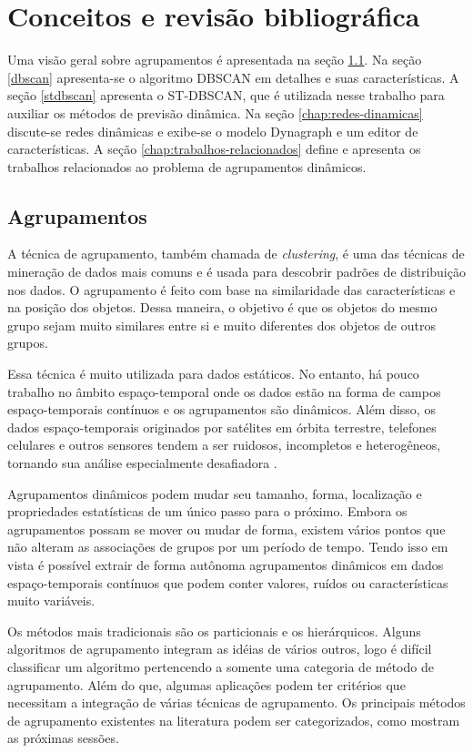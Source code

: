 \chapter{Conceitos e revisão bibliográfica}
\label{chap:estadodaarte}

Uma visão geral sobre agrupamentos é apresentada na seção \ref{agrupamentos}. Na seção \ref{dbscan} apresenta-se o algoritmo DBSCAN em detalhes e suas características. A seção \ref{stdbscan} apresenta o ST-DBSCAN, que é utilizada nesse trabalho para auxiliar os métodos de previsão dinâmica. Na seção  \ref{chap:redes-dinamicas}  discute-se redes dinâmicas e exibe-se o modelo Dynagraph e um editor de características. A seção  \ref{chap:trabalhos-relacionados}  define e apresenta os trabalhos relacionados ao problema de agrupamentos dinâmicos.

\section{Agrupamentos}
\label{agrupamentos}

A técnica de agrupamento, também chamada de \textit{clustering}, é uma das técnicas de mineração de dados mais comuns e é usada para descobrir padrões de distribuição nos dados. O agrupamento é feito com base na similaridade das características e na posição dos objetos. Dessa maneira, o objetivo é que os objetos do mesmo grupo sejam muito similares entre si e muito diferentes dos objetos de outros grupos.

Essa técnica é muito utilizada para dados estáticos. No entanto, há pouco trabalho no âmbito espaço-temporal onde os dados estão na forma de campos espaço-temporais contínuos e os agrupamentos são dinâmicos. Além disso, os dados espaço-temporais originados por satélites em órbita terrestre, telefones celulares e outros sensores tendem a ser ruidosos, incompletos e heterogêneos, tornando sua análise especialmente desafiadora \cite{faghmous2013}.

Agrupamentos dinâmicos podem mudar seu tamanho, forma, localização e propriedades estatísticas de um único passo para o próximo. Embora os agrupamentos possam se mover ou mudar de forma, existem vários pontos que não alteram as associações de grupos por um período de tempo. Tendo isso em vista é possível extrair de forma autônoma agrupamentos dinâmicos em dados espaço-temporais contínuos que podem conter valores, ruídos ou características muito variáveis.

Os métodos mais tradicionais são os particionais e os hierárquicos. Alguns algoritmos de agrupamento integram as idéias de vários outros, logo é difícil classificar um algoritmo pertencendo a somente uma categoria de método de agrupamento. Além do que, algumas aplicações podem ter critérios que necessitam a integração de várias técnicas de agrupamento. Os principais métodos de agrupamento existentes na literatura podem ser categorizados, como mostram as próximas sessões.

